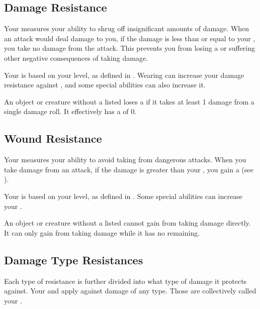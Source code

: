         \subsection{Damage Resistance}\label{Damage Resistance}
            Your  measures your ability to shrug off insignificant amounts of damage.
            When an attack would deal damage to you, if the damage is less than or equal to your , you take no damage from the attack.
            This prevents you from losing a  or suffering other negative consequences of taking damage.

            Your  is based on your level, as defined in .
            Wearing  can increase your damage resistance against , and some special abilities can also increase it.

             An object or creature without a listed  loses a  if it takes at least 1 damage from a single damage roll.
            It effectively has a  of 0.

        \subsection{Wound Resistance}\label{Wound Resistance}
            Your  measures your ability to avoid taking  from dangerous attacks.
            When you take damage from an attack, if the damage is greater than your , you gain a  (see ).

            Your  is based on your level, as defined in .
            Some special abilities can increase your .

             An object or creature without a listed  cannot gain  from taking damage directly.
            It can only gain  from taking damage while it has no  remaining.

        \subsection{Damage Type Resistances}\label{Damage Type Resistances}
            Each type of resistance is further divided into what type of damage it protects against.
            Your  and  apply against damage of any type.
            Those are collectively called your .

